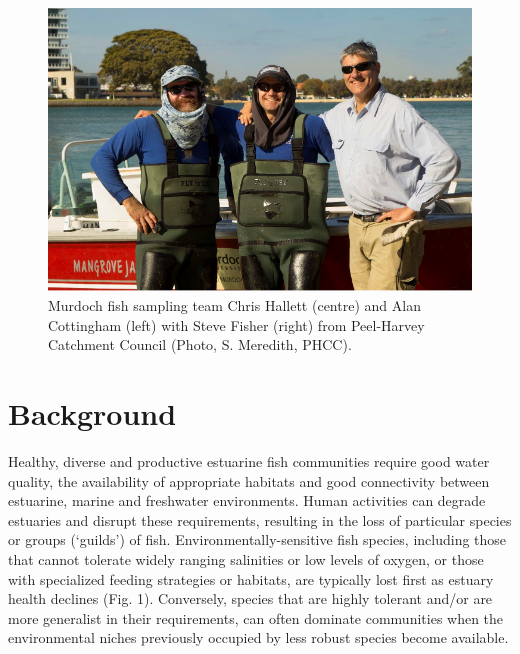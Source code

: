 \documentclass[
]{book}
\begin{document}
\begin{figure}
\includegraphics[width=1\linewidth]{images/fish_ecology/picture2} \caption{Murdoch fish sampling team Chris Hallett (centre) and Alan Cottingham (left) with Steve Fisher (right) from Peel-Harvey Catchment Council (Photo, S. Meredith, PHCC).}\label{fig:fish-ecology-pic2}
\end{figure}

\hypertarget{background-1}{%
\section{Background}\label{background-1}}

Healthy, diverse and productive estuarine fish communities require good water quality, the availability of appropriate habitats and good connectivity between estuarine, marine and freshwater environments. Human activities can degrade estuaries and disrupt these requirements, resulting in the loss of particular species or groups (`guilds') of fish. Environmentally-sensitive fish species, including those that cannot tolerate widely ranging salinities or low levels of oxygen, or those with specialized feeding strategies or habitats, are typically lost first as estuary health declines (Fig. 1). Conversely, species that are highly tolerant and/or are more generalist in their requirements, can often dominate communities when the environmental niches previously occupied by less robust species become available.
\end{document}
